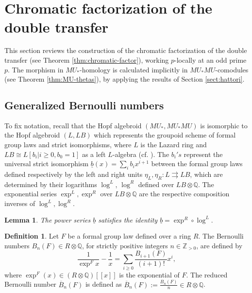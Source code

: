 \documentclass[10pt,a4paper]{amsart}
\newtheorem{lem}[thm]{Lemma}
\theoremstyle{definition}
\newtheorem{defn}[thm]{Definition}
\theoremstyle{remark}
\newcommand{\zedpos}{\zed_{>0}}
\newcommand{\divBern}{\overline{B}}
\newcommand{\zed}{\mathbb{Z}}
\newcommand{\rat}{\mathbb{Q}}
\begin{document}
%
\section{Chromatic factorization of the double transfer}
\label{section:chromatic}

This section reviews the construction of the chromatic factorization of the double transfer (see Theorem
\ref{thm:chromatic-factor}), working $p$-locally at an odd prime $p$.  The morphism in $MU_*$-homology is
calculated implicitly  in $MU_*MU$-comodules (see Theorem \ref{thm:MU-thetas}), by applying the results of Section \ref{sect:hattori}.




\subsection{Generalized Bernoulli numbers}
\label{subsect:recollections}

To fix notation, recall that the Hopf algebroid $(MU_* , MU_*MU)$ is isomorphic to the Hopf algebroid $(L, LB)$ which represents the groupoid scheme
of formal group laws and strict isomorphisms, where $L$ is the Lazard ring and
$L B \cong L [b_i | i \geq 0, b_0 =1]$ as a left $L$-algebra (cf.
\cite{ravenel_green}). The $b_i's$ represent the universal strict isomorphism
$\underline{b} (x) = \sum_i b_i x^{i+1}$ between the formal group laws defined
respectively by the left and right units $\eta_L,\eta_R : L \rightrightarrows
LB$, which are determined by their logarithms $\log^L$, $\log^R$ defined over
$LB \otimes\rat$. The exponential series $\exp^L, \exp^R$ over $LB \otimes \rat$ are the respective
composition inverses of $\log^L, \log^R$.

\begin{lem}
\label{lem:identify_b}
The power series $\underline{b}$ satisfies the identity
$
\underline{b} = \exp^R \circ \log ^L.
$
\end{lem}


\begin{defn}
\cite[Definition 1.1]{miller}
Let $F$ be a formal group law defined over a ring $R$. The Bernoulli numbers
$B_n(F) \in R \otimes \rat$, for strictly positive integers $n \in \zedpos$,  are defined by
\[
 \frac{1}{\exp^F x} - \frac{1}{x}  =
\sum _{i\geq 0} \frac{B_{i+1}(F)}{(i+1)!} x^i,
\]
where $\exp^F(x) \in (R \otimes \rat) [[x]]$ is the exponential of $F$. The reduced Bernoulli number $\divBern_n (F)$  is defined as $\divBern_n (F) :=\frac{B_n (F)}{n} \in R \otimes \rat$.
\end{defn}
\end{document}

